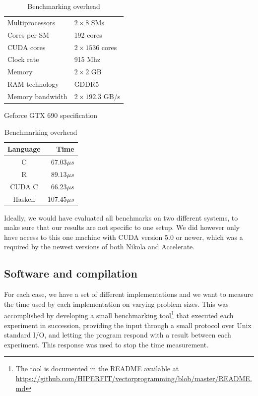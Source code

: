 \begin{table}
\begin{minipage}[b]{0.50\linewidth}
  \centering
  \begin{tabular}{ll}
    Multiprocessors & $2 \times 8$ SMs\\
    Cores per SM & 192 cores \\
    CUDA cores & $2 \times 1536$ cores\\
    Clock rate & 915 Mhz \\
    Memory & $2 \times 2$ GB \\
    RAM technology & GDDR5 \\
    Memory bandwidth & $2 \times 192.3$ GB/s \\
    \hline
  \end{tabular}
  \caption{Geforce GTX 690 specification}
  \label{tab:hardware}
\end{minipage}
\begin{minipage}[b]{0.50\linewidth}
  \centering
  \begin{tabular}{cr}
    \textbf{Language} & \textbf{Time}  \\ \hline
    C & $67.03 \mu s$ \\
    R & $89.13 \mu s$ \\
    CUDA C & $66.23 \mu s$ \\
    Haskell & $107.45 \mu s$ \\ \hline
  \end{tabular}
  \caption{Benchmarking overhead}
  \label{tab:benchmarking-overhead}
\end{minipage}
\end{table}

Ideally, we would have evaluated all benchmarks on two different
systems, to make sure that our results are not specific to one
setup. We did however only have access to this one machine with CUDA
version 5.0 or newer, which was a required by the newest versions of
both Nikola and Accelerate.

\subsection{Software and compilation}
For each case, we have a set of different implementations and we want
to measure the time used by each implementation on varying problem
sizes. This was accomplished by developing a small benchmarking
tool\footnote{The tool is documented in the README available at
  \url{https://github.com/HIPERFIT/vectorprogramming/blob/master/README.md}}
that executed each experiment in succession, providing the input
through a small protocol over Unix standard I/O, and letting the
program respond with a result between each experiment. This response
was used to stop the time measurement.

